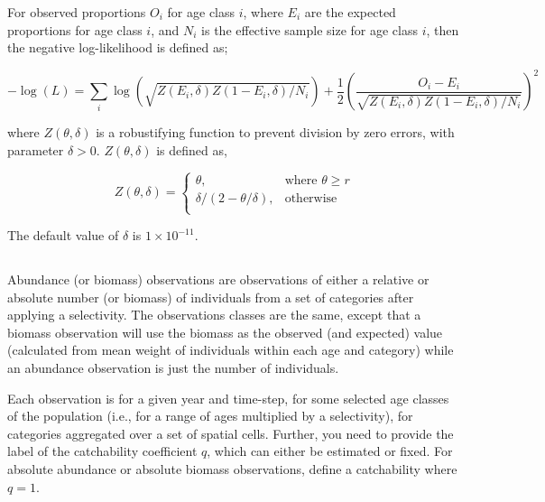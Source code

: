 {{{{{{For observed proportions $O_i$ for age class $i$, where $E_i$ are the expected proportions for age class $i$, and $N_i$ is the effective sample size for age class $i$, then the negative log-likelihood is defined as;  

\begin{equation}
  -\log \left(L \right)= \sum\limits_i \log \left( \sqrt{Z\left(E_i,\delta \right)Z\left(1-E_i,\delta\right)/N_i} \right)     + \frac{1}{2} \left( \frac{O_i-E_i}{\sqrt{Z\left(E_i,\delta\right)Z\left(1-E_i,\delta \right)/N_i}} \right)^2
\end{equation}

where $Z \left(\theta,\delta \right)$ is a robustifying function to prevent division by zero errors, with parameter $\delta>0$. $Z \left(\theta,\delta \right)$ is defined as,

\begin{equation}
   Z \left(\theta,\delta \right) = \begin{cases}
	  \theta, & \text{where $\theta \ge r$} \\
	  \delta/\left( 2-\theta/\delta \right), & \text{otherwise} \\  
  \end{cases}
\end{equation}

The default value of $\delta$ is $1 \times 10^{-11}$.

\subsection{}

Abundance (or biomass) observations are observations of either a relative or absolute number (or biomass) of individuals from a set of categories after applying a selectivity. The observations classes are the same, except that a biomass observation will use the biomass as the observed (and expected) value (calculated from mean weight of individuals within each age and category) while an abundance observation is just the number of individuals. 

Each observation is for a given year and time-step, for some selected age classes of the population (i.e., for a range of ages multiplied by a selectivity), for categories aggregated over a set of spatial cells. Further, you need to provide the label of the catchability coefficient $q$, which can either be estimated or fixed. For absolute abundance or absolute biomass observations, define a catchability where $q=1$.

}}}}}}
